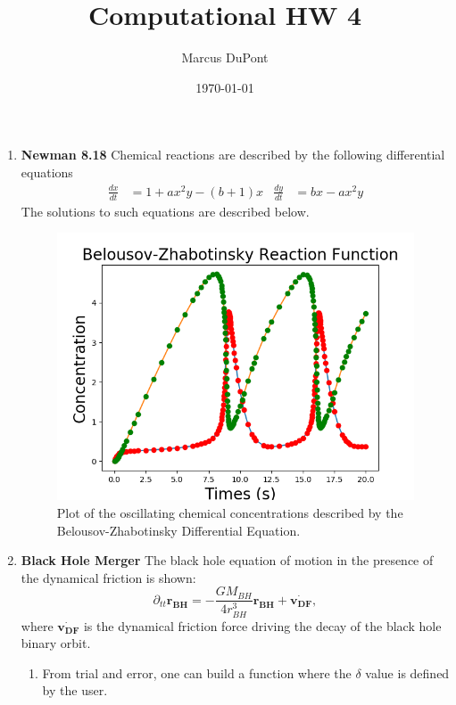 \documentclass{article}
\title{Computational HW 4}
\author{Marcus DuPont}
\date{\today}
\begin{document}
\maketitle

\begin{enumerate}
    \item {\textbf{Newman 8.18}
    Chemical reactions  are described by the following differential equations
    \begin{align*}
        \frac{dx}{dt} &= 1 + ax^2y - (b+1)x & \frac{dy}{dt} &= bx -ax^2y
    \end{align*}
    The solutions to such equations are described below.
    \begin{figure}[h!]
        \centering
        \includegraphics[width=\textwidth]{BZ.png}
        \caption{Plot of the oscillating chemical concentrations described by the Belousov-Zhabotinsky Differential Equation.}
        \label{fig: bk}
    \end{figure}
    }
    \item {\textbf{Black Hole Merger}
    The black hole equation of motion in the presence of the dynamical friction is shown:
    \begin{equation*}
        \partial_{tt}\pmb{r_{BH}} = - \frac{GM_{BH}}{4r_{BH}^3}\pmb{r_{BH}} + \pmb{\dot{v_{DF}}},
    \end{equation*}
    where $\pmb{\dot{v_{DF}}}$ is the dynamical friction force driving the decay of the black hole binary orbit.
    \begin{enumerate}
        \item{From trial and error, one can build a function where the $\delta$ value is defined by the user.
}
\end{enumerate}}
\end{enumerate}
\end{document}
